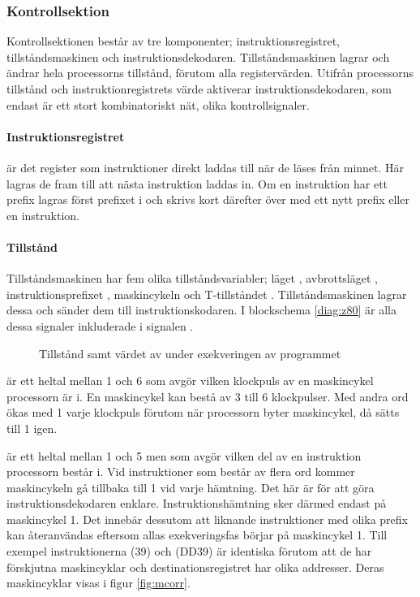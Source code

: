 \documentclass[main.tex]{subfiles}
\begin{document}
\subsubsection{Kontrollsektion}
Kontrollsektionen består av tre komponenter; instruktionsregistret,
tillståndsmaskinen och instruktionsdekodaren. Tillståndsmaskinen lagrar och
ändrar hela processorns tillstånd, förutom alla registervärden. Utifrån
processorns tillstånd och instruktionregistrets värde aktiverar
instruktionsdekodaren, som endast är ett stort kombinatoriskt nät, olika
kontrollsignaler.

\paragraph{Instruktionsregistret }
 är det register som instruktioner direkt laddas till när de läses
från minnet. Här lagras de fram till att nästa instruktion laddas in. Om en
instruktion har ett prefix lagras först prefixet i  och skrivs kort
därefter över med ett nytt prefix eller en instruktion.

\paragraph{Tillstånd}
Tillståndsmaskinen har fem olika tillståndsvariabler; läget ,
avbrottsläget , instruktionsprefixet , maskincykeln
 och T-tillståndet . Tillståndsmaskinen lagrar dessa och sänder
dem till instruktionskodaren. I blockschema \ref{diag:z80} är alla dessa
signaler inkluderade i signalen .

\begin{SCfigure}
    \centering
    
    \caption{Tillstånd samt värdet av  under exekveringen av
    programmet }
    \label{fig:tim-states}
\end{SCfigure}

 är ett heltal mellan 1 och 6 som avgör vilken klockpuls av en
maskincykel processorn är i. En maskincykel kan bestå av 3 till 6 klockpulser.
Med andra ord ökas  med 1 varje klockpuls förutom när processorn byter
maskincykel, då sätts  till 1 igen.

 är ett heltal mellan 1 och 5 men som avgör vilken del av en
instruktion processorn består i. Vid instruktioner som består av flera ord
kommer maskincykeln gå tillbaka till 1 vid varje hämtning. Det här är för att
göra instruktionsdekodaren enklare. Instruktionshämtning sker därmed endast på
maskincykel 1. Det innebär dessutom att liknande instruktioner med olika prefix
kan återanvändas eftersom allas exekveringsfas börjar på maskincykel 1. Till
exempel instruktionerna  (39) och  (DD39) är
identiska förutom att de har förskjutna maskincyklar och destinationsregistret
har olika addresser. Deras maskincyklar visas i figur \ref{fig:mcorr}.
\end{document}
